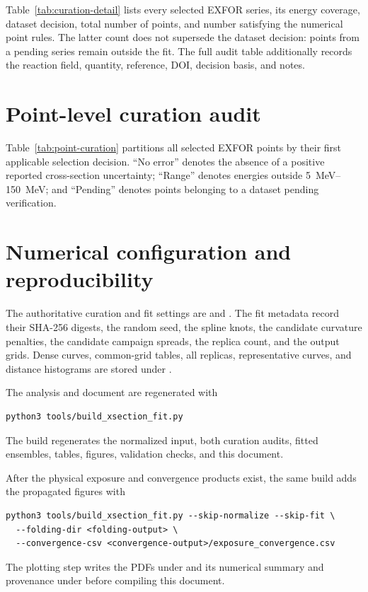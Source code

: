 \documentclass[11pt]{article}
\newcommand{\generateddir}{docs/generated/xsection_fit}
\newcommand{\generateddir}{generated/xsection_fit}
\begin{document}
Table~\ref{tab:curation-detail} lists every selected EXFOR series, its energy
coverage, dataset decision, total number of points, and number satisfying the
numerical point rules.  The latter count does not supersede the dataset
decision: points from a pending series remain outside the fit.  The full audit
table additionally records the reaction field, quantity, reference, DOI,
decision basis, and notes.

\begingroup
\small
\setlength{\LTcapwidth}{\textwidth}

\endgroup

\section{Point-level curation audit}

Table~\ref{tab:point-curation} partitions all selected EXFOR points by their
first applicable selection decision.  ``No error'' denotes the absence of a
positive reported cross-section uncertainty; ``Range'' denotes energies
outside \SIrange{5}{150}{MeV}; and ``Pending'' denotes points belonging to a
dataset pending verification.

\begin{table}[ht]
\centering\small
\caption{Point-level curation outcome by channel.}
\label{tab:point-curation}
\resizebox{\textwidth}{!}{}
\end{table}

\section{Numerical configuration and reproducibility}

The authoritative curation and fit settings are
 and
.  The fit metadata record their SHA-256
digests, the random seed, the spline knots, the candidate curvature penalties,
the candidate campaign spreads, the replica count, and the output grids.
Dense curves, common-grid tables, all replicas, representative curves, and
distance histograms are stored under .

The analysis and document are regenerated with
\begin{verbatim}
python3 tools/build_xsection_fit.py
\end{verbatim}
The build regenerates the normalized input, both curation audits, fitted
ensembles, tables, figures, validation checks, and this document.

After the physical exposure and convergence products exist, the same build
adds the propagated figures with
\begin{verbatim}
python3 tools/build_xsection_fit.py --skip-normalize --skip-fit \
  --folding-dir <folding-output> \
  --convergence-csv <convergence-output>/exposure_convergence.csv
\end{verbatim}
The plotting step writes the PDFs under
 and its numerical summary and provenance
under  before compiling this document.
\end{document}
